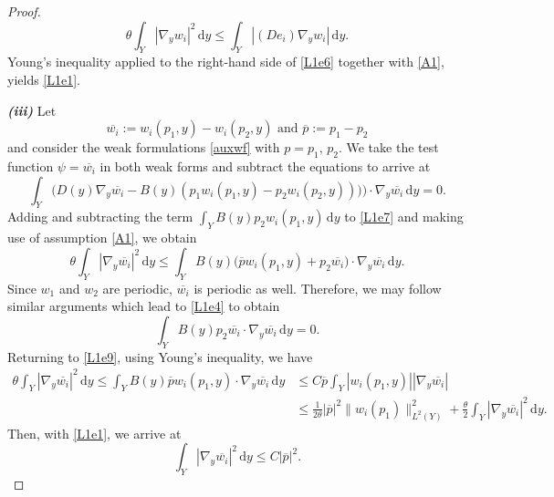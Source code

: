 \documentclass[11pt]{article}
\newcommand{\di}[1]{\,\mathrm{d}#1}
\begin{document}
\begin{proof}
\begin{equation}
     \theta \int_{Y} |\nabla_y w_i|^2  \di{y} \leq \int_{Y} | (D e_i) \nabla_y w_i| \di{y}.\label{L1e6}
\end{equation}
Young's inequality applied to the right-hand side of \eqref{L1e6} together with \ref{A1}, yields \eqref{L1e1}.
%
\par \textbf{\textit{(iii)}} Let
\begin{equation*}
    \overline{w_i}:=w_i(p_1,y)-w_i(p_2,y) \text{ and }\overline{p}:=p_1-p_2
\end{equation*}
and consider the weak formulations \eqref{auxwf} with $p= p_1,\,p_2$. 
We take the test function $\psi = \overline{w_i}$ in both weak forms and subtract the equations to arrive at
\begin{equation}
    \int_{Y}\big(D(y)\nabla_y \overline{w_i}- B(y)(p_1w_i(p_1,y)-p_2w_i(p_2,y)))\big)\cdot \nabla _y \overline{w_i}\di{y}=0\label{L1e7}.
\end{equation}
Adding and subtracting the term $\int_Y B(y)p_2w_i(p_1,y)\di{y}$ to \eqref{L1e7} and making use of assumption \ref{A1}, we obtain
%
\begin{equation}\label{L1e9}
    \theta\int_{Y} |\nabla_y \overline{w_i} |^2 \di{y}
    \leq \int_{Y}B(y)\big(\overline{p}w_i(p_1,y)+p_2\overline{w_i}\big)\cdot \nabla _y \overline{w_i} \di{y}.
\end{equation}
Since $w_1$ and $w_2$ are periodic, $\overline{w_i}$ is periodic as well.
Therefore, we may follow similar arguments which lead to  \eqref{L1e4}  to obtain
\begin{equation}\label{L1e10}
    \int_{Y}B(y)p_2\overline{w_i}\cdot \nabla _y \overline{w_i}\di{y}=0.
\end{equation}
Returning to \eqref{L1e9}, using Young's inequality, we have
\begin{align}
    \theta\int_{Y} |\nabla_y \overline{w_i} |^2 \di{y}\leq\int_{Y}B(y)\overline{p}w_i(p_1,y)\cdot \nabla _y \overline{w_i}\di{y}&\leq C \overline{p}\int_{Y}|w_i(p_1,y)|| \nabla _y \overline{w_i}| \nonumber\\
    &\leq \frac{1}{2\theta}|\overline{p}|^2 \|w_i(p_1)\|_{L^2(Y)}^2+\frac{\theta}{2} \int_{Y} |\nabla_y \overline{w_i} |^2 \di{y}.\label{L1e11}
\end{align}
Then, with \eqref{L1e1}, we arrive at
\begin{equation}
    \int_{Y} |\nabla_y \overline{w_i} |^2 \di{y}\leq  C|\overline{p}|^2.\label{L1e12}
\end{equation}

\end{proof}
\end{document}
